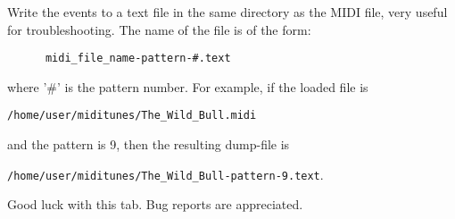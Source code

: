    Write the events to a text file in the same directory as the MIDI file, very
   useful for troubleshooting.  The name of the file is of the form:

   \begin{verbatim}
      midi_file_name-pattern-#.text
   \end{verbatim}

   where '\#' is the pattern number.  For example, if the loaded file is

   \texttt{/home/user/miditunes/The\_Wild\_Bull.midi}

   and the pattern is 9, then the resulting dump-file is

   \texttt{/home/user/miditunes/The\_Wild\_Bull-pattern-9.text}.

   Good luck with this tab.  Bug reports are appreciated.

